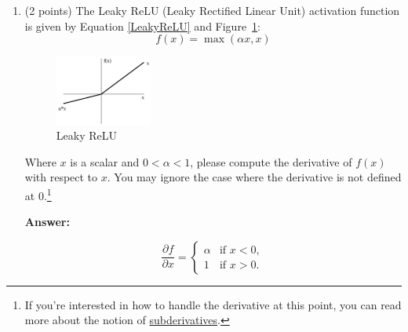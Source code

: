 \documentclass{article}
\newenvironment{answer}{
    {\bf Answer:} \sf \begingroup\color{red}
}{\endgroup}%
\begin{document}
\begin{enumerate}[label=(\alph*)]
\begin{shaded}
\begin{answer}
    Using our conclusion \ref{partial J for u}, we can write the partial derivate matrix easily:

    \begin{align*}
        \frac{\partial \bm J_{\text{naive-softmax}}(\bm v_c, o, \bm U)}{\partial \bm U}
        & = \left[\frac{\partial \bm J(\bm v_c, o, \bm U)}{\partial \bm u_1}, \frac{\partial \bm J(\bm v_c, o, \bm U)}{\partial \bm u_2}, \dots, \frac{\partial \bm J(\bm v_c, o, \bm U)}{\partial \bm u_o}, \dots,  \frac{\partial \bm J(\bm v_c, o, \bm U)}{\partial \bm u_{|\text{Vocab}|}}\right] \\
        & = \left[\bm y_1^\top \bm v_c, \bm y_2^\top \bm v_c, \dots,- \bm v_c + \bm y_o^\top \bm v_c, \dots, \bm y_{|\text{Vocab}|}^\top \bm v_c\right] \\
        & = (\hat{\bm y} - \bm y)^\top \bm v_c
    \end{align*}
\end{answer}
\end{shaded}

\item (2 points) The Leaky ReLU (Leaky Rectified Linear Unit) activation function is given by Equation \ref{LeakyReLU} and Figure~\ref{fig:leaky_relu}:
\begin{equation}
    \label{LeakyReLU}
    f(x) = \max(\alpha x, x)
\end{equation}

\begin{figure}[h]
    \centering
    \includegraphics[width=0.3\textwidth]{leaky_relu_graph.png}
    \caption{Leaky ReLU}
    \label{fig:leaky_relu}
\end{figure}

Where $x$ is a scalar and $0<\alpha <1$, please compute the derivative of $f(x)$ with respect to $x$. You may ignore the case where the derivative is not defined at 0.\footnote{If you're interested in how to handle the derivative at this point, you can read more about the notion of \hyperref[https://en.wikipedia.org/wiki/Subderivative]{subderivatives}.}

\begin{shaded}
\begin{answer}
    \[ \frac{\partial f}{\partial x} =
    \begin{cases}
        \alpha & \text{if } x < 0, \\
        1 & \text{if } x > 0.
    \end{cases}\]
\end{answer}
\end{shaded}


\end{enumerate}
\end{document}
